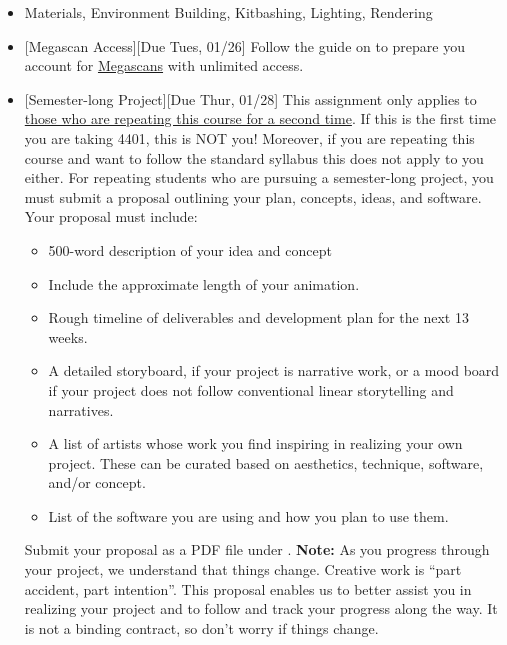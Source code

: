 \def\dMon{Mon, 01/25}
\def\dTues{Tues, 01/26}
\def\dWed{Wed, 01/27}
\def\dThur{Thur, 01/28}
\def\dFri{Fri, 01/29}
\def\dSat{Sat, 01/30}
\def\dSun{Sun, 01/31}
\placeDate

\begin{itemize}[noitemsep,topsep=0pt,leftmargin=*]
    \item {} Materials, Environment Building, Kitbashing, Lighting, Rendering
    \item {}[Megascan Access][Due \dTues] Follow the guide on  to prepare you account for \href{https://quixel.com/megascans}{Megascans} with unlimited access.
    \item {}[Semester-long Project][Due \dThur] This assignment only applies to \ul{those who are repeating this course for a second time}. If this is the first time you are taking 4401, this is NOT you! Moreover, if you are repeating this course and want to follow the standard syllabus this does not apply to you either. For repeating students who are pursuing a semester-long project, you must submit a proposal outlining your plan, concepts, ideas, and software. Your proposal must include:
          \begin{itemize}
              \item 500-word description of your idea and concept
              \item Include the approximate length of your animation.
              \item Rough timeline of deliverables and development plan for the next 13 weeks.
              \item A detailed storyboard, if your project is narrative work, or a mood board if your project does not follow conventional linear storytelling and narratives.
              \item A list of artists whose work you find inspiring in realizing your own project. These can be curated based on aesthetics, technique, software, and/or concept.
              \item List of the software you are using and how you plan to use them.
          \end{itemize}
          Submit your proposal as a PDF file under . \newline
          \small{\textbf{Note:} As you progress through your project, we understand that things change. Creative work is ``part accident, part intention''. This proposal enables us to better assist you in realizing your project and to follow and track your progress along the way. It is not a binding contract, so don't worry if things change.}

\end{itemize}
